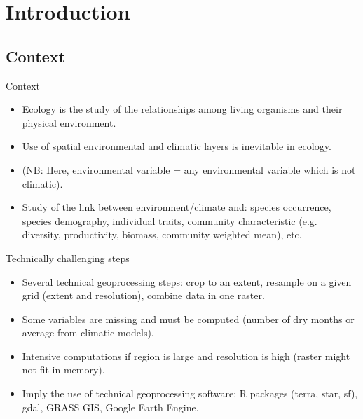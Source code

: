 \documentclass[10pt,table,dvipsnames,compress]{beamer}
\begin{document}
\section{Introduction}
\label{sec:org0eb0830}

\subsection{Context}
\label{sec:org7e22b93}

\begin{frame}[label={sec:org92109d8}]{Context}
\begin{itemize}
\item Ecology is the study of the relationships among living organisms and their physical environment.
\item Use of spatial environmental and climatic layers is inevitable in ecology.
\item (NB: Here, environmental variable = any environmental variable which is not climatic).
\item Study of the link between environment/climate and: species occurrence, species demography, individual traits, community characteristic (e.g. diversity, productivity, biomass, community weighted mean), etc.
\end{itemize}
\end{frame}

\begin{frame}[label={sec:orgb93b7c3}]{Technically challenging steps}
\begin{itemize}
\item Several technical geoprocessing steps: crop to an extent, resample on a given grid (extent and resolution), combine data in one raster.
\item Some variables are missing and must be computed (number of dry months or average from climatic models).
\item Intensive computations if region is large and resolution is high (raster might not fit in memory).
\item Imply the use of technical geoprocessing software: R packages (terra, star, sf), gdal, GRASS GIS, Google Earth Engine.
\end{itemize}
\end{frame}
\end{document}
